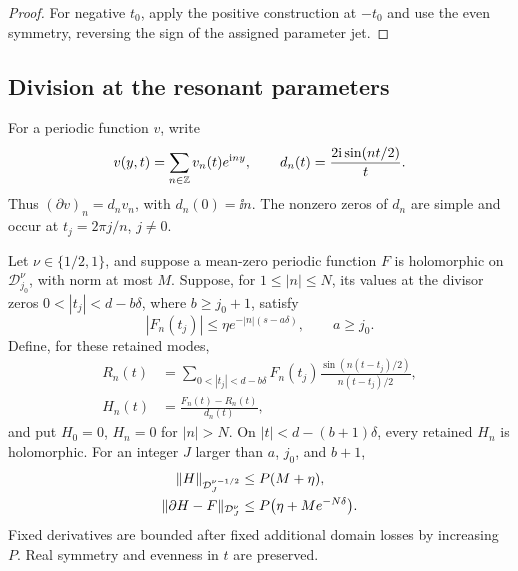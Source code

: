 \begin{proof}
For negative \(t_0\), apply the positive construction at \(-t_0\) and
use the even symmetry, reversing the sign of the assigned parameter jet.
\end{proof}

\subsection{Division at the resonant parameters}

For a periodic function \(v\), write
\[
 v(y,t)=\sum_{n\in\mathbb Z}v_n(t)e^{\mathrm i ny},\qquad
 d_n(t)=\frac{2\mathrm i\sin(nt/2)}{t}.
\]
Thus \((\partial v)_n=d_nv_n\), with \(d_n(0)=\ii n\).
The nonzero zeros of \(d_n\) are simple and occur at
\(t_j=2\pi j/n\), \(j\ne0\).

\begin{lemma}
\label{joint:fourier-division}
Let \(\nu\in\{1/2,1\}\), and suppose a mean-zero periodic function
\(F\) is holomorphic on \(\mathcal D_{j_0}^\nu\), with norm at most
\(M\). Suppose, for \(1\le |n|\le N\), its values at the divisor zeros
\(0<|t_j|<d-b\delta\), where \(b\ge j_0+1\), satisfy
\[
 |F_n(t_j)|\le\eta e^{-|n|(s-a\delta)},
 \qquad a\ge j_0.
\]
Define, for these retained modes,
\begin{align}
 R_n(t)&=\sum_{0<|t_j|<d-b\delta}F_n(t_j)
       \frac{\sin(n(t-t_j)/2)}{n(t-t_j)/2},\label{joint:sinc-interpolant}\\
 H_n(t)&=\frac{F_n(t)-R_n(t)}{d_n(t)},
 \label{joint:divided-coefficient}
\end{align}
and put \(H_0=0\), \(H_n=0\) for \(|n|>N\).
On \(|t|<d-(b+1)\delta\), every retained \(H_n\) is holomorphic.
For an integer \(J\) larger than \(a\), \(j_0\), and \(b+1\),
\begin{align}
 \|H\|_{\mathcal D_J^{\nu-1/2}}&\le P(M+\eta),\notag\\
 \|\partial H-F\|_{\mathcal D_J^\nu}
       &\le P\bigl(\eta+Me^{-N\delta}\bigr).
 \label{joint:division-bounds}
\end{align}
Fixed derivatives are bounded after fixed additional domain losses by
increasing \(P\). Real symmetry and evenness in \(t\) are preserved.
\end{lemma}

